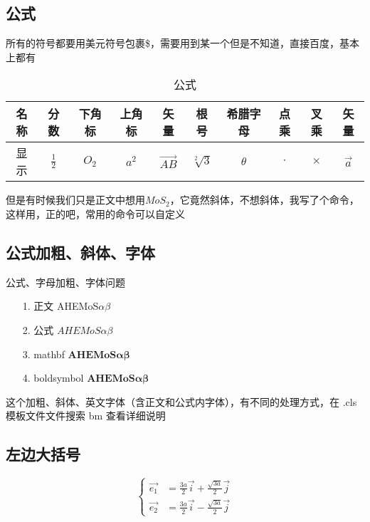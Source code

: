 \documentclass[AutoFakeBold]{LZUThesis}
\begin{document}


\subsection{公式} %
\label{sub:公式}
所有的符号都要用美元符号包裹\$，需要用到某一个但是不知道，直接百度，基本上都有
\begin{table}[H]
    \centering
    \caption{公式}
    \begin{tabular}{cccccccccc} %
    \toprule
    名称& 分数 & 下角标 & 上角标  & 矢量 & 根号 & 希腊字母 & 点乘 & 叉乘 & 矢量\\
    \midrule
    显示 & $\frac{1}{2}$ & $O_2$  & $a^2$ & $\vec{AB}$ & $\sqrt[2]{3}$ & $\theta$ & $\cdot$ & $\times$& $\vec{a}$\\
   
    \bottomrule
    \end{tabular}
    \label{tbl_gs}
\end{table}

但是有时候我们只是正文中想用$MoS_2$，它竟然斜体，不想斜体，我写了个命令，这样用，正的吧，常用的命令可以自定义

\subsection{公式加粗、斜体、字体}

公式、字母加粗、字体问题

\begin{itemize}
  \item [1. 正文] AHEMoS$\alpha \beta$
  \item[2. 公式]  $AHEMoS \alpha \beta$
  \item[3. mathbf] $\mathbf{AHEMoS\alpha \beta}$
  \item [4. boldsymbol] $\boldsymbol{AHEMoS\alpha \beta}$
\end{itemize}

这个加粗、斜体、英文字体（含正文和公式内字体），有不同的处理方式，在 .cls 模板文件文件搜索 bm 查看详细说明



\subsection{左边大括号} %
\label{sub:左边大括号}

\begin{equation}
    \left\{
    \begin{array}{rcl}
        \vec{e_1} &= \frac{3a}{2} \vec{i} + \frac{\sqrt{3a}}{2} \vec{j} \\
        \vec{e_2} &= \frac{3a}{2} \vec{i} - \frac{\sqrt{3a}}{2} \vec{j}
    \end{array}
    \right.
    \label{e1e2}
\end{equation}
\end{document}
